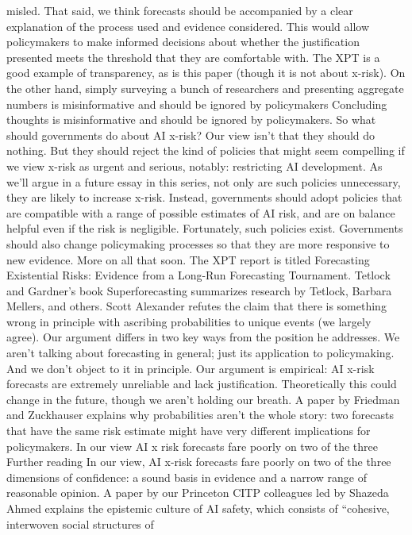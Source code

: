 misled. That said, we think forecasts should be accompanied by a
clear explanation of the process used and evidence considered. This
would allow policymakers to make informed decisions about whether
the justiﬁcation presented meets the threshold that they are
comfortable with. The XPT is a good example of transparency, as is
this paper (though it is not about x-risk). On the other hand, simply
surveying a bunch of researchers and presenting aggregate numbers
is misinformative and should be ignored by policymakers
Concluding thoughts
is misinformative and should be ignored by policymakers.
So what should governments do about AI x-risk? Our view isn’t that
they should do nothing. But they should reject the kind of policies
that might seem compelling if we view x-risk as urgent and serious,
notably: restricting AI development. As we’ll argue in a future essay
in this series, not only are such policies unnecessary, they are likely
to increase x-risk. Instead, governments should adopt policies that
are compatible with a range of possible estimates of AI risk, and are
on balance helpful even if the risk is negligible. Fortunately, such
policies exist. Governments should also change policymaking
processes so that they are more responsive to new evidence. More
on all that soon.
The XPT report is titled Forecasting Existential Risks: Evidence
from a Long-Run Forecasting Tournament.
Tetlock and Gardner’s book Superforecasting summarizes
research by Tetlock, Barbara Mellers, and others.
Scott Alexander refutes the claim that there is something wrong
in principle with ascribing probabilities to unique events (we
largely agree). Our argument differs in two key ways from the
position he addresses. We aren’t talking about forecasting in
general; just its application to policymaking. And we don’t object
to it in principle. Our argument is empirical: AI x-risk forecasts
are extremely unreliable and lack justiﬁcation. Theoretically this
could change in the future, though we aren’t holding our breath.
A paper by Friedman and Zuckhauser explains why probabilities
aren’t the whole story: two forecasts that have the same risk
estimate might have very different implications for policymakers.
In our view AI x risk forecasts fare poorly on two of the three
Further reading
In our view, AI x-risk forecasts fare poorly on two of the three
dimensions of conﬁdence: a sound basis in evidence and a
narrow range of reasonable opinion.
A paper by our Princeton CITP colleagues led by Shazeda
Ahmed explains the epistemic culture of AI safety, which
consists of “cohesive, interwoven social structures of
